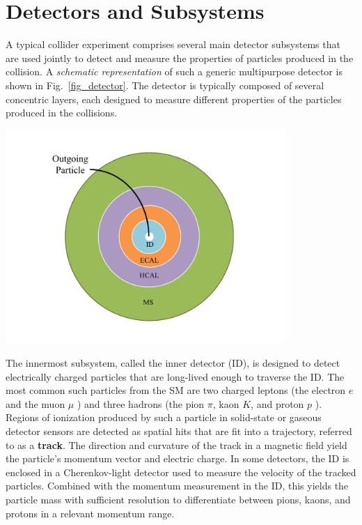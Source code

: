 \section{Detectors and Subsystems}

A typical collider experiment comprises several main detector subsystems that are used jointly to detect and measure the properties of particles produced in the collision. A \textit{schematic representation} of such a generic multipurpose detector is shown in Fig.~\ref{fig_detector}. The detector is typically composed of several concentric layers, each designed to measure different properties of the particles produced in the collisions. 

\begin{center}
	\includegraphics[width=0.8\textwidth]{Images/transversal_detector.pdf}
	\label{fig_detector}
\end{center}

The innermost subsystem, called the inner detector (ID), is designed to detect electrically charged particles that are long-lived enough to traverse the ID. The most common such particles from the SM are two charged leptons (the electron $e$ and the muon $\mu$ ) and three hadrons (the pion $\pi$, kaon $K$, and proton $p$ ). Regions of ionization produced by such a particle in solid-state or gaseous detector sensors are detected as spatial hits that are fit into a trajectory, referred to as a \textbf{track}. The direction and curvature of the track in a magnetic field yield the particle's momentum vector and electric charge. In some detectors, the ID is enclosed in a Cherenkov-light detector used to measure the velocity of the tracked particles. Combined with the momentum measurement in the ID, this yields the particle mass with sufficient resolution to differentiate between pions, kaons, and protons in a relevant momentum range.

